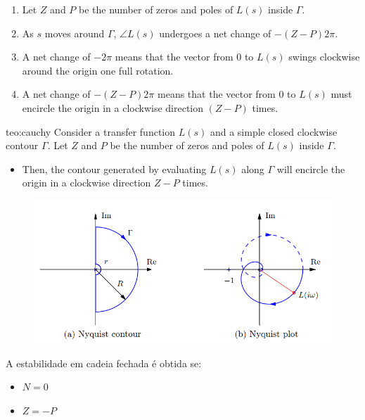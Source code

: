 {

\begin{mdframed}

    \begin{enumerate}
    \item Let $Z$ and $P$ be the number of zeros and poles of $L(s)$ inside $\Gamma$.
    \item As $s$ moves around $\Gamma$, $\angle L(s)$ undergoes a net change of $-(Z - P)2\pi$.
    \item A net change of $-2\pi$ means that the vector from $0$ to $L(s)$ swings clockwise around the origin one full rotation.
    \item A net change of $-(Z - P)2\pi$ means that the vector from $0$ to $L(s)$ must encircle the origin in a clockwise direction $(Z - P)$ times.
    \end{enumerate}

    \begin{theo}{teo:cauchy}\label{teo:cauchy}
    Consider a transfer function $L(s)$ and a simple closed clockwise contour $\Gamma$. Let $Z$ and $P$ be the number of zeros and poles of $L(s)$ inside $\Gamma$.
    \begin{itemize}
    \item Then, the contour generated by evaluating $L(s)$ along $\Gamma$ will encircle the origin in a clockwise direction $Z - P$ times.
    \end{itemize}
    \end{theo}

    \begin{figure}[H]
        \centering
        \includegraphics[width = 0.8\linewidth]{img/4/cauchy-arg-theorem.png}
        \label{fig:cauchy-theorem}
    \end{figure}
\end{mdframed}
}

A estabilidade em cadeia fechada é obtida se:
\begin{itemize}
    \item $N = 0$
    \item $Z = -P$
\end{itemize}

